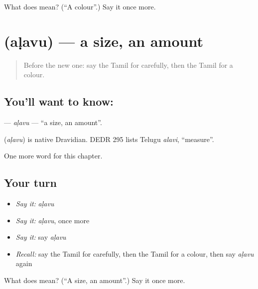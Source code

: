 \begin{tcolorbox}[breakable,colback=teal!4,colframe=teal!35!black,title={Before you move on}]
What does  mean? (\textquotedblleft{}A colour\textquotedblright{}.) Say it once more.
\end{tcolorbox}
\section[\texorpdfstring{\ta{அளவு} (aḷavu)}{அளவு (aḷavu)}]{ (aḷavu) — a size, an amount}

\label{lesson:TA-C238-alavu}



\begin{quote}
Before the new one: say the Tamil for carefully, then the Tamil for a colour.
\end{quote}

\subsection*{You'll want to know: }
\textbf{} — \emph{aḷavu} — \textquotedblleft{}a size, an amount\textquotedblright{}.

\begin{cousinweb}
\textbf{} (\emph{aḷavu}) is native Dravidian. DEDR 295 lists Telugu \emph{alavi}, \textquotedblleft{}measure\textquotedblright{}.
\end{cousinweb}

\begin{grammarlens}[title={What you've built}]
One more word for this chapter.
\end{grammarlens}

\subsection*{Your turn}
\begin{itemize}
\raggedright
  \item \emph{Say it:} \emph{aḷavu}
  \item \emph{Say it:} \emph{aḷavu}, once more
  \item \emph{Say it:} say \emph{aḷavu}
  \item \emph{Recall:} say the Tamil for carefully, then the Tamil for a colour, then say \emph{aḷavu} again
\end{itemize}

\begin{tcolorbox}[breakable,colback=teal!4,colframe=teal!35!black,title={Before you move on}]
What does  mean? (\textquotedblleft{}A size, an amount\textquotedblright{}.) Say it once more.
\end{tcolorbox}
